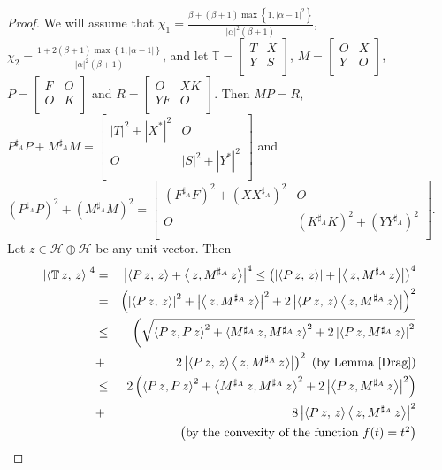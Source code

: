 \documentclass{article}
\newcommand{\bra}[1]{\left(#1\right)}
\newcommand{\seq}[1]{\left<#1\right>}
\newcommand{\abs}[1]{\left\vert#1\right\vert}
\newcommand{\set}[1]{\left\{#1\right\}}
\newcommand{\hh}{\mathcal{H}\oplus\mathcal{H}}
\newcommand {\Ma}{M^{\sharp_{A}}}
\newcommand {\T}{\mathbb{T}}
\newcommand {\Xa}{X^{\sharp_{A}}}
\newcommand {\Ya}{Y^{\sharp_{A}}}
\newcommand {\Ka}{K^{\sharp_{A}}}
\newcommand {\Fa}{F^{\sharp_{A}}}
\newcommand {\Pa}{P^{\sharp_{A}}}
\begin{document}
\begin{proof} We will assume that $\chi_1=\frac{\beta+(\beta+1)\max\set{1,\abs{\alpha-1}^2}}{\abs{\alpha}^2(\beta+1)}$,
$\chi_2=\frac{1+2(\beta+1)\max\set{1,\abs{\alpha-1}}}{\abs{\alpha}^2(\beta+1)}$, and let $\T=\begin{bmatrix} T& X\\ Y& S \\\end{bmatrix}$,
$M=\begin{bmatrix} O& X\\ Y& O\\\end{bmatrix}$, $P=\begin{bmatrix} F& O\\ O& K \\\end{bmatrix}$ and $R=\begin{bmatrix} O& XK\\ YF& O \\\end{bmatrix}$.
Then $MP=R$, $ \Pa P+\Ma M=\begin{bmatrix} |T|^2+|X^*|^2& O\\ O& |S|^2+|Y^*|^2 \\\end{bmatrix}$ and
$(\Pa P)^2+(\Ma M)^2=\begin{bmatrix} (\Fa F)^2+(X\Xa)^2& O\\ O& (\Ka K)^2+(Y\Ya)^2 \\\end{bmatrix}$.
Let  $z\in\hh$ be any unit vector. Then
\begin{eqnarray*}
  \abs{\seq{\T\,z,\,z}}^4 &=& \abs{\seq{P\,z,\,z}+\seq{\,z,\Ma\,z}}^4\leq \bra{\abs{\seq{P\,z,\,z}}+\abs{\seq{\,z,\Ma\,z}}}^4 \\
   &=&\bra{\abs{\seq{P\,z,\,z}}^2+\abs{\seq{\,z,\Ma\,z}}^2+2\abs{\seq{P\,z,\,z}\seq{\,z,\Ma\,z}}}^2\\
   &\leq&\left(\sqrt{\seq{P\,z,P\,z}^2+\seq{\Ma\,z,\Ma\,z}^2+2\abs{\seq{P\,z,\Ma\,z}}^2}\right.\\
   &+&\left.2\abs{\seq{P\,z,\,z}\seq{\,z,\Ma\,z}}\right)^2\,\,\bra{\mbox{by Lemma \ref{Drag}}}\\
   &\leq& 2\bra{\seq{P\,z,P\,z}^2+\seq{\Ma\,z,\Ma\,z}^2+2\abs{\seq{P\,z,\Ma\,z}}^2}\\
   &+&8\abs{\seq{P\,z,\,z}\seq{\,z,\Ma\,z}}^2\\
   &&\bra{\mbox{by the convexity of the function $f(t)=t^2$}}\\

\end{eqnarray*}
\end{proof}
\end{document}
